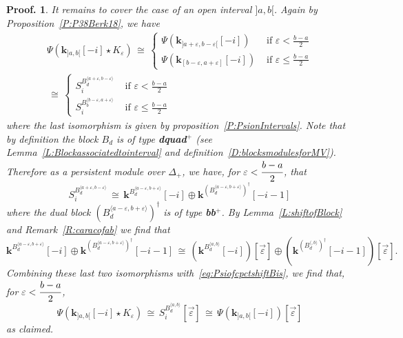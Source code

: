 \documentclass[a4paper, english, 11pt]{article}
\newcommand{\kk}[0]{\textbf{k}}
\newcommand{\0}{\vec{0}}
\newtheorem*{pf}{Proof.} }
\begin{document}
\begin{pf}
It remains to cover the case of an open interval $]a,b[$. Again by  Proposition~\ref{P:P38Berk18}, we have 
\begin{multline}\label{eq:PsiofcpctshiftBis}
 \Psi(\kk_{]a,b[}[-i] \star K_{\varepsilon}) \,\cong \,  \left\{ \begin{array}{ll}\Psi(\kk_{]a+\varepsilon,b-\varepsilon[}[-i]) & \mbox{ if }\varepsilon <\frac{b-a}{2} \\
      \Psi(\kk_{[b-\varepsilon,a+\varepsilon]}[-i]) & \mbox{ if }\varepsilon \leqslant\frac{b-a}{2} \end{array} \right .
      \\ \, \cong \, \left\{ \begin{array}{ll}S_i^{B_d^{\langle a+\varepsilon,b-\varepsilon\rangle}} & \mbox{ if }\varepsilon <\frac{b-a}{2} \\
      S_i^{B_b^{\langle b-\varepsilon,a+\varepsilon\rangle}} & \mbox{ if }\varepsilon \leqslant\frac{b-a}{2}                                                          \end{array}\right .
\end{multline} where the last isomorphism is given by proposition~\ref{P:PsionIntervals}.
Note that by definition the block $B_d$ is of type \textbf{dquad}$^+$ (see Lemma~\ref{L:Blockassociatedtointerval} and definition~\ref{D:blocksmodulesforMV}). Therefore as a persistent module over $\Delta_+$, we have, for $\varepsilon < \cfrac{b-a}{2}$, that
$$S_i^{B_{d}^{\langle a+\varepsilon, b -\varepsilon\rangle}} \,\cong\, \kk^{B_{d}^{\langle a-\varepsilon, b+\varepsilon \rangle}} [-i] \oplus \kk^{(B_{d}^{\langle a-\varepsilon, b+\varepsilon \rangle})^\dagger} [-i-1]$$ where the dual block $(B_{d}^{\langle a-\varepsilon, b+\varepsilon \rangle})^\dagger$ is of type \textbf{bb}$^{+}$.  
By Lemma~\ref{L:shiftofBlock} and Remark~\ref{R:caracofab} we find that 
$$\kk^{B_{d}^{\langle a-\varepsilon, b+\varepsilon \rangle}} [-i] \oplus \kk^{(B_{d}^{\langle a-\varepsilon, b+\varepsilon \rangle})^\dagger} [-i-1] \, \cong \,(\kk^{B_{d}^{\langle a, b \rangle}} [-i])[\vec{\varepsilon}] \oplus (\kk^{(B_{d}^{\langle , b\rangle})^\dagger} [-i-1])[\vec{\varepsilon}]. $$
Combining these last two isomorphisms with~\eqref{eq:PsiofcpctshiftBis}, we find that,  for $\varepsilon < \cfrac{b-a}{2}$,
\begin{equation} \Psi(\kk_{]a,b[}[-i] \star K_{\varepsilon}) \,\cong \, S_i^{B_d^{\langle a, b\rangle}} [\vec{\varepsilon}]\, \cong \, \Psi(\kk_{]a,b[}[-i]) [\vec{\varepsilon}]
\end{equation}
as claimed.


\end{pf}
\end{document}
